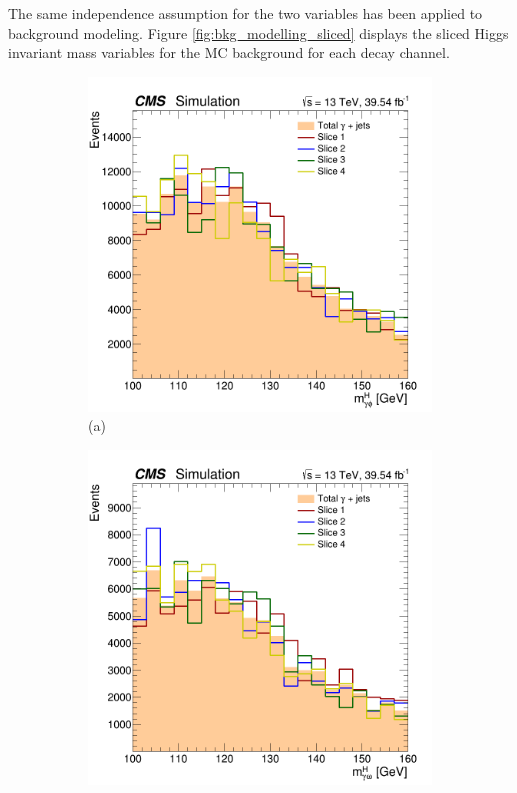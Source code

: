 The same independence assumption for the two variables has been applied to background modeling. Figure \ref{fig:bkg_modelling_sliced} displays the sliced Higgs invariant mass variables for the MC background for each decay channel.
\begin{figure}[!ht]
    \captionsetup[subfigure]{labelformat=empty}
    \vspace*{-0.2cm}
    \centering
    \setlength{\mylength}{\textwidth}
    \begin{subfigure}[t]{0.50\mylength}
        \centering
        \includegraphics[width=0.49\mylength]{resources/plots/Phi3_fit_BKG_MH_sliced.png}
        \vspace*{-0.2cm}
        \caption{\footnotesize (a)}
    \end{subfigure}%
    \begin{subfigure}[t]{0.50\mylength}
        \centering
        \includegraphics[width=0.49\mylength]{resources/plots/Omega_fit_BKG_MH_sliced.png}

\end{subfigure}
\end{figure}
